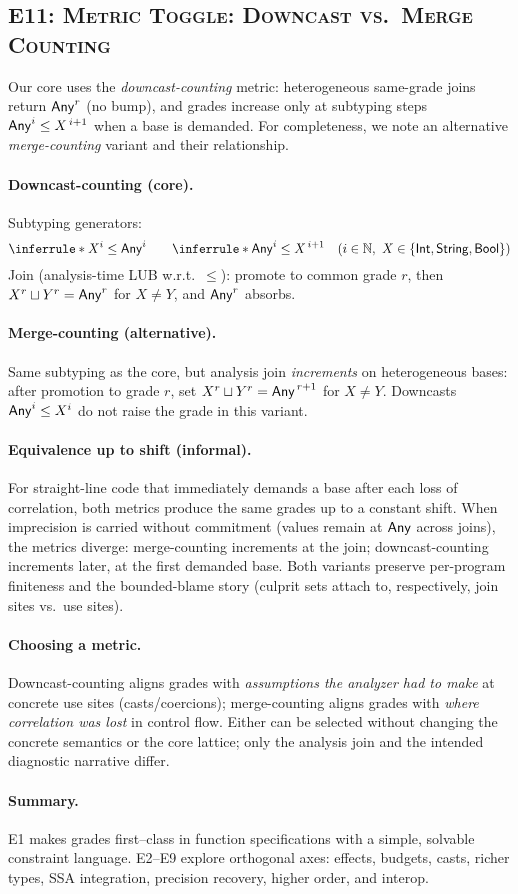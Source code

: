 \subsection{\textsc{E11: Metric Toggle: Downcast vs.\ Merge Counting}}

Our core uses the \emph{downcast-counting} metric:
heterogeneous same-grade joins return \(\mathsf{Any}^{r}\) (no bump), and grades increase only at subtyping steps \(\mathsf{Any}^{i}\le X^{\,i+1}\) when a base is demanded.
For completeness, we note an alternative \emph{merge-counting} variant and their relationship.

\paragraph{Downcast-counting (core).}
Subtyping generators:
\[
\inferrule*{ }{X^{i}\le \Any^{i}}
\qquad
\inferrule*{ }{\Any^{i}\le X^{\,i+1}}
\quad(i\in\mathbb{N},\ X\in\{\Int,\String,\Bool\})
\]
Join (analysis-time LUB w.r.t.\ \(\le\)): promote to common grade \(r\), then
\(X^{r}\sqcup Y^{r}=\mathsf{Any}^{r}\) for \(X\neq Y\), and \(\mathsf{Any}^{r}\) absorbs.

\paragraph{Merge-counting (alternative).}
Same subtyping as the core, but analysis join \emph{increments} on heterogeneous bases:
after promotion to grade \(r\), set \(X^{r}\sqcup Y^{r}=\mathsf{Any}^{\,r+1}\) for \(X\neq Y\).
Downcasts \(\mathsf{Any}^{i}\le X^{i}\) do not raise the grade in this variant.

\paragraph{Equivalence up to shift (informal).}
For straight-line code that immediately demands a base after each loss of correlation, both metrics produce the same grades up to a constant shift.
When imprecision is carried without commitment (values remain at \(\mathsf{Any}\) across joins), the metrics diverge:
merge-counting increments at the join; downcast-counting increments later, at the first demanded base.
Both variants preserve per-program finiteness and the bounded-blame story (culprit sets attach to, respectively, join sites vs.\ use sites).

\paragraph{Choosing a metric.}
Downcast-counting aligns grades with \emph{assumptions the analyzer had to make} at concrete use sites (casts/coercions);
merge-counting aligns grades with \emph{where correlation was lost} in control flow.
Either can be selected without changing the concrete semantics or the core lattice; only the analysis join and the intended diagnostic narrative differ.

\paragraph{Summary.}
\textsc{E1} makes grades first–class in function specifications with a simple, solvable constraint language.
\textsc{E2}–\textsc{E9} explore orthogonal axes: effects, budgets, casts, richer types, SSA integration, precision recovery, higher order, and interop.
